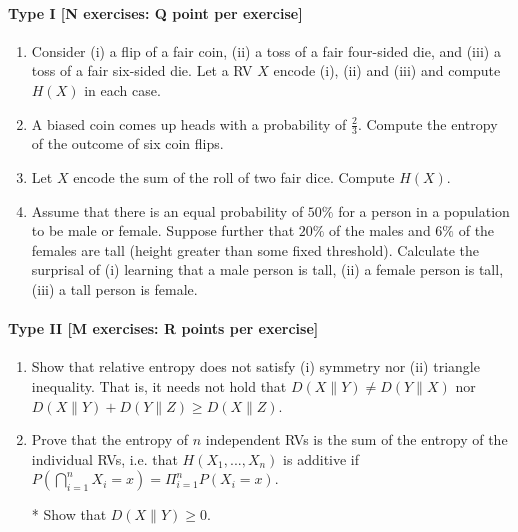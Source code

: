 \documentclass{article}
\begin{document}
\paragraph{Type I [N exercises: Q point per exercise]}
\begin{enumerate}
	\item Consider (i) a flip of a fair coin, (ii) a toss of a fair four-sided die, and (iii) a toss of a fair six-sided die. Let a RV $X$ encode (i), (ii) and (iii) and compute $H(X)$ in each case.
	\item A biased coin comes up heads with a probability of $\frac{2}{3}$. Compute the entropy of the outcome of six coin flips.
	\item Let $X$ encode the sum of the roll of two fair dice. Compute $H(X)$.
	\item Assume that there is an equal probability of $50\%$ for a person in a population to be male or female. Suppose further that $20\%$ of the males and $6\%$ of the females are tall (height greater than some fixed threshold). Calculate the surprisal of (i) learning that a male person is tall, (ii) a female person is tall, (iii) a tall person is female.
\end{enumerate}

\paragraph{Type II [M exercises: R points per exercise]}
\begin{enumerate}
	\item Show that relative entropy does not satisfy (i) symmetry nor (ii) triangle inequality. That is, it needs not hold that $D(X\parallel Y) \neq  D(Y \parallel X)$ nor $D(X\parallel Y) + D(Y\parallel Z) \geq D(X \parallel Z)$.
	\item Prove that the entropy of $n$ independent RVs is the sum of the entropy of the individual RVs, i.e. that  $H(X_1, ..., X_n)$ is additive if $P(\bigcap_{i = 1}^{n} X_i=x) = \Pi_{i = 1}^n P(X_i=x)$.
	\item[*] Show that $D(X\parallel Y) \geq 0$.

\end{enumerate}
\end{document}
